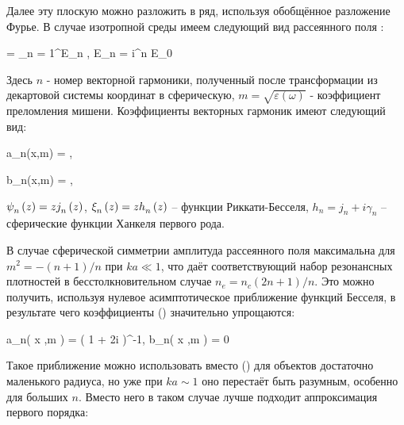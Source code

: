Далее эту плоскую можно разложить в ряд, используя обобщённое разложение Фурье. В случае изотропной среды имеем следующий вид рассеянного поля \cite{boren_huffman}:

    \eq
		 = \sum_{n = 1}^{\infty}E_n , \qquad E_n = i^{n} E_0 
        \label{E_s_sph}
	\qe

Здесь $n$ - номер векторной гармоники, полученный после трансформации из декартовой системы координат в сферическую, $m = \sqrt{\varepsilon\left(\omega\right)}$ - коэффициент преломления мишени. Коэффициенты векторных гармоник имеют следующий вид:


    \eq
		a_n(x,\:m) = ,
		\label{an_bessel}
	\qe

    \eq
        b_n(x,\:m) = ,
        \label{bn_bessel}
    \qe

 ${\psi}_{n}^{} \left( {z} \right) = z {j}_{n}^{} \left( {z} \right)$, ${\xi}_{n}^{} \left( {z} \right) = z {h}_{n}^{} \left( {z} \right)$ -- функции Риккати-Бесселя, $h_n = j_n + i \gamma_n$ -- сферические функции Ханкеля первого рода.

В случае сферической симметрии амплитуда рассеянного поля максимальна для $m^2 = - (n+ 1) / n$ при $ka \ll 1$, что даёт соответствующий набор резонансных плотностей в бесстолкновительном случае $n_e = n_c(2n + 1) / n$. Это можно получить, используя нулевое асимптотическое приближение функций Бесселя, в результате чего коэффициенты () значительно упрощаются:

    \eq
        a_n\left( x ,\:m \right) = \left( 1 + 2i    \right)^{-1}, \qquad b_n\left( x ,\:m \right) = 0
        \label{ab_asymp}
    \qe

Такое приближение можно использовать вместо () для объектов достаточно маленького радиуса, но уже при $ka \sim 1$ оно перестаёт быть разумным, особенно для больших $n$. Вместо него в таком случае лучше подходит аппроксимация первого порядка:

